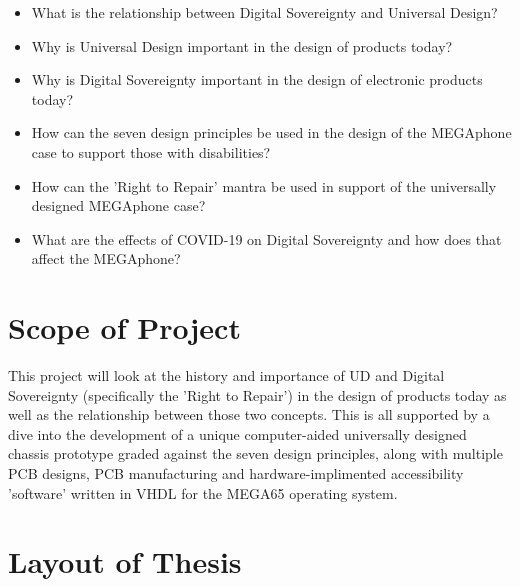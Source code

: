 \begin{itemize} 
    \item What is the relationship between Digital Sovereignty and Universal Design?
    \item Why is Universal Design important in the design of products today?
    \item Why is Digital Sovereignty important in the design of electronic products today?
    \item How can the seven design principles be used in the design of the MEGAphone case to support those with disabilities?
    \item How can the 'Right to Repair' mantra be used in support of the universally designed MEGAphone case?
    \item What are the effects of COVID-19 on Digital Sovereignty and how does that affect the MEGAphone? %
    \end{itemize}


\section{Scope of Project}

This project will look at the history and importance of UD and Digital Sovereignty (specifically the 'Right to Repair') in the design of products today as well as the relationship between those two concepts.
This is all supported by a dive into the development of a unique computer-aided universally designed chassis prototype graded against the seven design principles\cite{sevenprinciples}, along with multiple PCB designs, PCB manufacturing and hardware-implimented accessibility 'software' written in VHDL for the MEGA65 operating system.


\section{Layout of Thesis}

